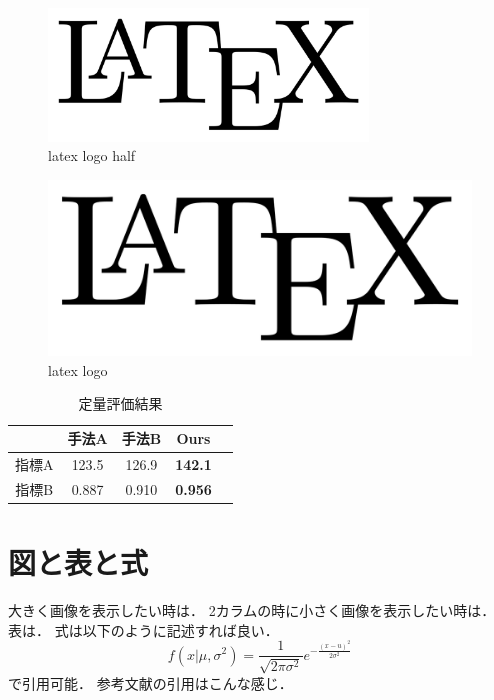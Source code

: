 \begin{figure}[t]
  \begin{center}
    \includegraphics[width=8.5cm]{figs/latex_logo.png}
    \caption{latex logo half}
    \label{fig:latex_logo_half}
  \end{center}
\end{figure}

\begin{figure}[t]
\centering
    \includegraphics[width=\textwidth]{./figs/latex_logo.png}
    \caption{latex logo}
    \label{fig:latex_logo}
\end{figure}

\begin{table}[t]
    \centering
\caption{定量評価結果}
\label{tab:quantitative_eval}
\begin{tabular}{ccccc}
    \toprule
& 手法A & 手法B & Ours \\
    \midrule
指標A & 123.5 & 126.9 & {\bf 142.1} \\
指標B & 0.887 & 0.910 & {\bf 0.956} \\
\bottomrule
\end{tabular}
\end{table}

\section{図と表と式}
大きく画像を表示したい時は．
2カラムの時に小さく画像を表示したい時は．
表は．
式は以下のように記述すれば良い．
%
\begin{equation}
\label{eq:gauss}
f(x | \mu, \sigma^2) = \frac{1}{\sqrt{2 \pi \sigma^2}} e^{-\frac{(x - u)^2}{2 \sigma^2}}
\end{equation}
で引用可能．
%
参考文献の引用はこんな感じ\cite{goodfellow2014generative}．